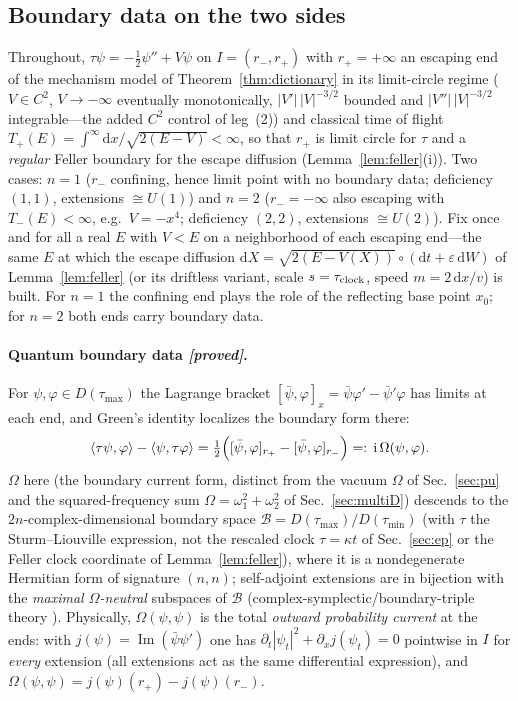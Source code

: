 \documentclass[11pt]{article}
\theoremstyle{definition}
\theoremstyle{remark}
\newcommand{\dd}{\mathrm{d}}
\newcommand{\ii}{\mathrm{i}}
\begin{document}
\subsection{Boundary data on the two sides}
\label{app:completions-setup}

Throughout, $\tau\psi=-\tfrac12\psi''+V\psi$ on $I=(r_{-},r_{+})$ with
$r_{+}=+\infty$ an escaping end of the mechanism model of
Theorem~\ref{thm:dictionary} in its limit-circle regime ($V\in C^{2}$, $V\to-\infty$ eventually
monotonically, $|V'|\,|V|^{-3/2}$ bounded and $|V''|\,|V|^{-3/2}$
integrable---the added $C^{2}$ control of leg~(2)) and classical time of flight
$T_{+}(E)=\int^{\infty}\dd x/\sqrt{2(E-V)}<\infty$, so that $r_{+}$ is
limit circle for $\tau$ \cite{ReedSimon2} and a \emph{regular} Feller
boundary for the escape diffusion (Lemma~\ref{lem:feller}(i)). Two
cases: $n=1$ ($r_{-}$ confining, hence limit point with no boundary
data; deficiency $(1,1)$, extensions $\cong U(1)$) and $n=2$
($r_{-}=-\infty$ also escaping with $T_{-}(E)<\infty$, e.g.\
$V=-x^{4}$; deficiency $(2,2)$, extensions $\cong U(2)$). Fix once and
for all a real $E$ with $V<E$ on a neighborhood of each escaping
end---the same $E$ at which the escape diffusion
$\dd X=\sqrt{2(E-V(X))}\circ(\dd t+\varepsilon\,\dd W)$ of
Lemma~\ref{lem:feller} (or its driftless variant, scale $s=\tau_{\rm
clock}$, speed $m=2\,\dd x/v$) is built. For $n=1$ the confining end
plays the role of the reflecting base point $x_{0}$; for $n=2$ both
ends carry boundary data.

\paragraph{Quantum boundary data \emph{[proved]}.}
For $\psi,\varphi\in D(\tau_{\max})$ the Lagrange bracket
$[\bar\psi,\varphi]_{x}=\bar\psi\varphi'-\bar\psi'\varphi$ has limits
at each end, and Green's identity localizes the boundary form there:
\begin{equation}
\langle\tau\psi,\varphi\rangle-\langle\psi,\tau\varphi\rangle
=\tfrac12\Bigl([\bar\psi,\varphi]_{r_{+}}
-[\bar\psi,\varphi]_{r_{-}}\Bigr)
=:\,\ii\,\Omega(\psi,\varphi).
\label{eq:greenform}
\end{equation}
$\Omega$ here (the boundary current form, distinct from the vacuum
$\Omega$ of Sec.~\ref{sec:pu} and the squared-frequency sum $\Omega=\omega_1^{2}+\omega_2^{2}$
of Sec.~\ref{sec:multiD}) descends to the $2n$-complex-dimensional boundary space
$\mathcal B=D(\tau_{\max})/D(\tau_{\min})$ (with $\tau$ the
Sturm--Liouville expression, not the rescaled clock $\tau=\kappa t$ of
Sec.~\ref{sec:ep} or the Feller clock coordinate of Lemma~\ref{lem:feller}), where it is a nondegenerate
Hermitian form of signature $(n,n)$; self-adjoint extensions are in
bijection with the \emph{maximal $\Omega$-neutral} subspaces of
$\mathcal B$ (complex-symplectic/boundary-triple theory
\cite{EverittMarkus,BHS,Zettl}). Physically, $\Omega(\psi,\psi)$ is the
total \emph{outward probability current} at the ends: with
$j(\psi)=\operatorname{Im}(\bar\psi\psi')$ one has
$\partial_{t}|\psi_{t}|^{2}+\partial_{x}j(\psi_{t})=0$ pointwise in $I$
for \emph{every} extension (all extensions act as the same differential
expression), and $\Omega(\psi,\psi)=j(\psi)(r_{+})-j(\psi)(r_{-})$.
\end{document}
